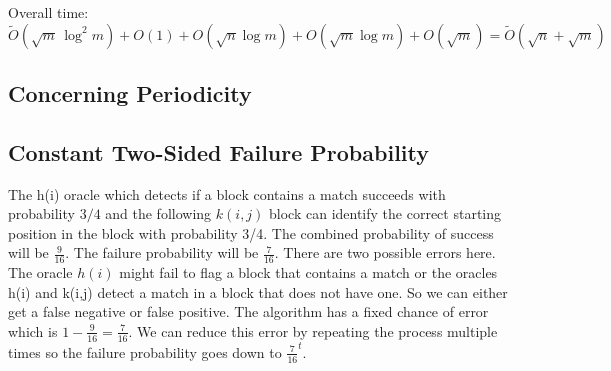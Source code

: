 \documentclass[12pt]{IEEEtran}
\begin{document}
Overall time: \(\widetilde O(\sqrt{m}\,\log^2 m) + O(1) + O(\sqrt{n} \log m) + O(\sqrt{m} \log m) + O(\sqrt{m}) = \widetilde{O}(\sqrt{n} + \sqrt{m})\)

\subsection{Concerning Periodicity}

\subsection{Constant Two-Sided Failure Probability}
The h(i) oracle which detects if a block contains a match succeeds with probability \(3/4\) and the following \(k(i,j)\) block can identify the correct starting position in the block with probability 3/4.
The combined probability of success will be \(\frac{9}{16}\). The failure probability will be \(\frac{7}{16}\). There are two possible errors here. The oracle \(h(i)\) might fail to flag a block that contains a match or
the oracles h(i) and k(i,j) detect a match in a block that does not have one. So we can either get a false negative or false positive. The algorithm has a fixed chance of error which is \(1-\frac{9}{16} = \frac{7}{16}\).
We can reduce this error by repeating the process multiple times so the failure probability goes down to \(\frac{7}{16}^t\).



\end{document}

